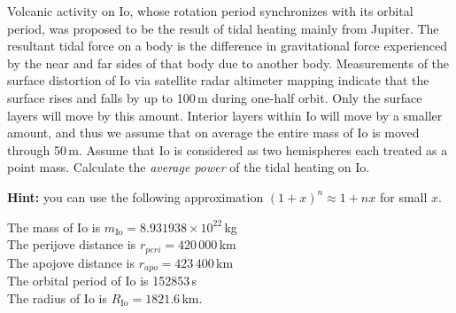 Volcanic activity on Io, whose rotation period synchronizes with its orbital
period, was proposed to be the result of tidal heating mainly from Jupiter.
The resultant tidal force on a body is the difference in gravitational force
experienced by the near and far sides of that body due to another body.
Measurements of the surface distortion of Io via satellite radar altimeter
mapping indicate that the surface rises and falls by up to 100\,m during
one-half orbit. Only the surface layers will move by this amount. Interior
layers within Io will move by a smaller amount, and thus we assume that on
average the entire mass of Io is moved through 50\,m. Assume that Io is
considered as two hemispheres each treated as a point mass. Calculate the
\emph{average power} of the tidal heating on Io.

\textbf{Hint:} you can use the following approximation
$(1+x)^n \approx 1 + nx$ for small $x$.

The mass of Io is $m_{\mathrm{Io}} = 8.931938 \times 10^{22}$\,kg\\
The perijove distance is $r_{peri} = 420\,000$\,km\\
The apojove distance is $r_{apo} = 423\,400$\,km\\
The orbital period of Io is 152853\,s\\
The radius of Io is $R_{\mathrm{Io}} = 1821.6$\,km.
